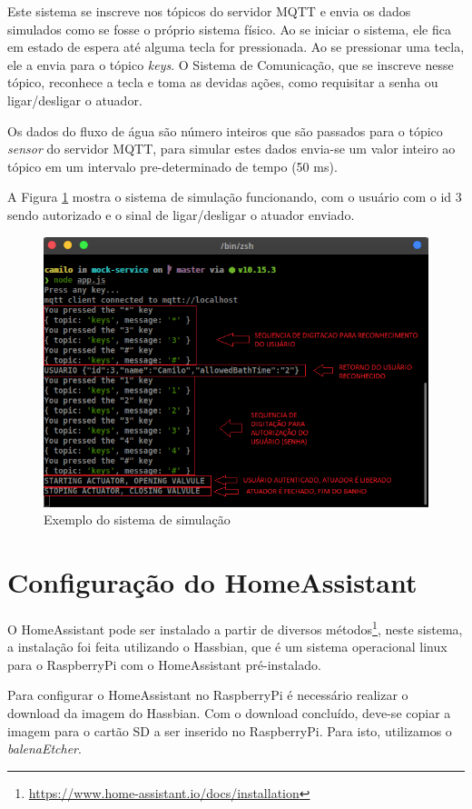 Este sistema se inscreve nos tópicos do servidor MQTT e envia os dados simulados como se fosse o próprio sistema físico. Ao se iniciar o sistema, ele fica em estado de espera até alguma tecla for pressionada. Ao se pressionar uma tecla, ele a envia para o tópico \textit{keys}. O Sistema de Comunicação, que se inscreve nesse tópico, reconhece a tecla e toma as devidas ações, como requisitar a senha ou ligar/desligar o atuador.

Os dados do fluxo de água são número inteiros que são passados para o tópico \textit{sensor} do servidor MQTT, para simular estes dados envia-se um valor inteiro ao tópico em um intervalo pre-determinado de tempo (50 ms).

A Figura \ref{fig:mockservice} mostra o sistema de simulação funcionando, com o usuário com o id 3 sendo autorizado e o sinal de ligar/desligar o atuador enviado.

\begin{figure}[htbp]
	\centering
	\includegraphics[width=0.6\linewidth]{figuras/mockservice.png}
	\caption{Exemplo do sistema de simulação}
	\label{fig:mockservice}
\end{figure}

\newpage

\section{Configuração do HomeAssistant}

O HomeAssistant pode ser instalado a partir de diversos métodos\footnote{\url{https://www.home-assistant.io/docs/installation}}, neste sistema, a instalação foi feita utilizando o Hassbian, que é um sistema operacional linux para o RaspberryPi com o HomeAssistant pré-instalado.

Para configurar o HomeAssistant no RaspberryPi é necessário realizar o download da imagem do Hassbian. Com o download concluído, deve-se copiar a imagem para o cartão SD a ser inserido no RaspberryPi. Para isto, utilizamos o \textit{balenaEtcher}.

